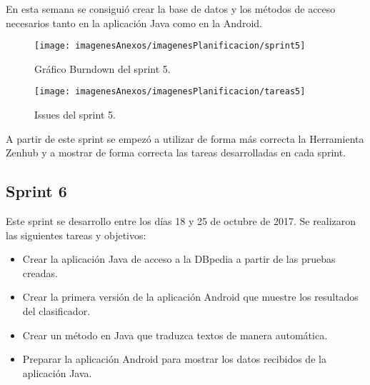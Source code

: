 En esta semana se consiguió crear la base de datos y los métodos de acceso necesarios tanto en la aplicación Java como en la Android.

\begin{figure}[h]
    \begin{center}%
        \begin{center}%
          \texttt{[image: imagenesAnexos/imagenesPlanificacion/sprint5]}%
          \caption{Gráfico Burndown del sprint 5.}%
          \label{figSprint5}%
        \end{center}%
  	\end{center}%
\end{figure}%

\begin{figure}[h]
    \begin{center}%
        \begin{center}%
          \texttt{[image: imagenesAnexos/imagenesPlanificacion/tareas5]}%
          \caption{Issues del sprint 5.}%
          \label{figTareas5}%
        \end{center}%
  	\end{center}%
\end{figure}%

\newpage

A partir de este sprint se empezó a utilizar de forma más correcta la Herramienta Zenhub y a mostrar de forma correcta las tareas desarrolladas en cada sprint.

\subsection{Sprint 6}

Este sprint se desarrollo entre los días 18 y 25 de octubre de 2017. Se realizaron las siguientes tareas y objetivos:

\begin{itemize}
	\item Crear la aplicación Java de acceso a la DBpedia a partir de las pruebas creadas.
	\item Crear la primera versión de la aplicación Android que muestre los resultados del clasificador.
	\item Crear un método en Java que traduzca textos de manera automática.
	\item Preparar la aplicación Android para mostrar los datos recibidos de la aplicación Java.
\end{itemize}

